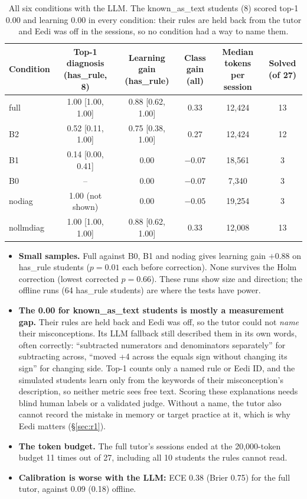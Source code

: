 \documentclass[11pt,a4paper]{article}
\newcommand{\grp}[1]{\textsf{#1}}
\newcommand{\cond}[1]{\textsf{#1}}
\begin{document}
\begin{table}[H]
\centering\small
\begin{tabularx}{\linewidth}{@{}lCCCCC@{}}
\toprule
Condition & Top-1 diagnosis (\grp{has\_rule}, 8) & Learning gain (\grp{has\_rule}) & Class gain (all) & Median tokens per session & Solved (of 27) \\
\midrule
{}full & 1.00 [1.00, 1.00] & 0.88 [0.62, 1.00] & 0.33 & 12,424 & 13 \\
B2 & 0.52 [0.11, 1.00] & 0.75 [0.38, 1.00] & 0.27 & 12,424 & 12 \\
B1 & 0.14 [0.00, 0.41] & 0.00 & $-0.07$ & 18,561 & 3 \\
B0 & -- & 0.00 & $-0.07$ & 7,340 & 3 \\
nodiag & 1.00 (not shown) & 0.00 & $-0.05$ & 19,254 & 3 \\
nollmdiag & 1.00 [1.00, 1.00] & 0.88 [0.62, 1.00] & 0.33 & 12,008 & 13 \\
\bottomrule
\end{tabularx}
\caption{All six conditions with the LLM. The \grp{known\_as\_text} students (8) scored top-1 0.00 and learning 0.00 in every condition: their rules are held back from the tutor and Eedi was off in the sessions, so no condition had a way to name them.}
\end{table}

\begin{itemize}
  \item \textbf{Small samples.} Full against B0, B1 and \cond{nodiag} gives learning gain $+0.88$ on \grp{has\_rule} students ($p = 0.01$ each before correction). None survives the Holm correction (lowest corrected $p = 0.66$). These runs show size and direction; the offline runs (64 \grp{has\_rule} students) are where the tests have power.
  \item \textbf{The 0.00 for \grp{known\_as\_text} students is mostly a measurement gap.} Their rules are held back and Eedi was off, so the tutor could not \emph{name} their misconceptions. Its LLM fallback still described them in its own words, often correctly: ``subtracted numerators and denominators separately'' for subtracting across, ``moved +4 across the equals sign without changing its sign'' for changing side. Top-1 counts only a named rule or Eedi ID, and the simulated students learn only from the keywords of their misconception's description, so neither metric sees free text. Scoring these explanations needs blind human labels or a validated judge. Without a name, the tutor also cannot record the mistake in memory or target practice at it, which is why Eedi matters (\S\ref{sec:r1}).
  \item \textbf{The token budget.} The full tutor's sessions ended at the 20,000-token budget 11 times out of 27, including all 10 students the rules cannot read.
  \item \textbf{Calibration is worse with the LLM:} ECE 0.38 (Brier 0.75) for the full tutor, against 0.09 (0.18) offline.
\end{itemize}
\end{document}
